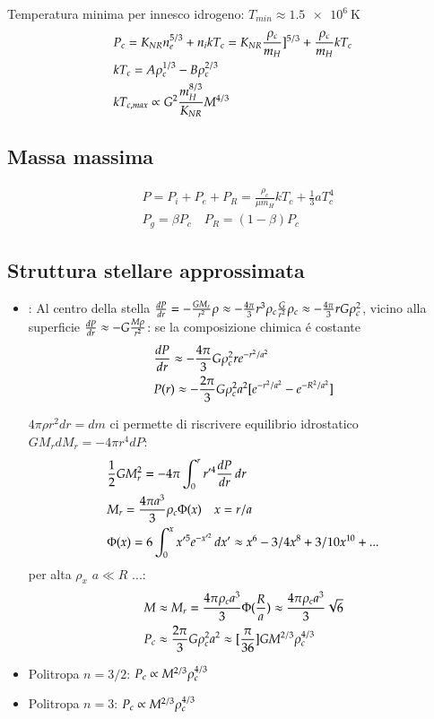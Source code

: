 \documentclass[main.tex]{subfiles}
\begin{document}
Temperatura minima per innesco idrogeno: $T_{min}\approx\SI{1.5e6}{\kelvin}$
\begin{align*}
&P_c=K_{NR}n_e\expy{5/3}+n_ikT_c=K_{NR}\frac{\rho_c}{m_H}]\expy{5/3}+\frac{\rho_c}{m_H}kT_c\\
&kT_c=A\rho_c\expy{1/3}-B\rho_c\expy{2/3}\\
&kT_{c,max}\propto G^2\frac{m_H\expy{8/3}}{K_{NR}}M\expy{4/3}
\end{align*}

\subsection{Massa massima}

\begin{align*}
&P=P_i+P_e+P_R=\frac{\rho_c}{\mu m_H}kT_c+\frac{1}{3}aT_c^4\\
&P_g=\beta P_c\quad P_R=(1-\beta)P_c
\end{align*}

\subsection{Struttura stellare approssimata}

\begin{itemize}
\item {}:
Al centro della stella $\TDy{r}{P}=-\frac{GM_r}{r^2}\rho\approx-\frac{4\pi}{3}r^3\rho_c\frac{G}{r^2}\rho_c\approx-\frac{4\pi}{3}rG\rho_c^2$, vicino alla superficie $\TDy{r}{P}\approx-G\frac{M\rho}{r^2}$: se la composizione chimica \'e costante
\begin{align*}
&\TDy{r}{P}\approx-\frac{4\pi}{3}G\rho_c^2r\exp{-r^2/a^2}\\
&P(r)\approx-\frac{2\pi}{3}G\rho_c^2a^2[\exp{-r^2/a^2}-\exp{-R^2/a^2}]
\end{align*}

$4\pi\rho r^2dr=dm$ ci permette di riscrivere equilibrio idrostatico $GM_rdM_r=-4\pi r^4dP$:
\begin{align*}
&\frac{1}{2}GM_r^2=-4\pi\int_0^rr'^4\TDy{r}{P}\,dr\\
&M_r=\frac{4\pi a^3}{3}\rho_c\Phi(x)\quad x=r/a\\
&\Phi(x)=6\int_0^xx'^5\exp{-x'^2}\,dx'\approx x^6-3/4x^8+3/10x\expy{10}+...
\end{align*}
per alta $\rho_x$ $a\ll R$ ...:
\begin{align*}
&M\approx M_r=\frac{4\pi\rho_ca^3}{3}\Phi(\frac{R}{a})\approx\frac{4\pi\rho_ca^3}{3}\sqrt{6}\\
&P_c\approx\frac{2\pi}{3}G\rho_c^2a^2\approx[\frac{\pi}{36}]GM\expy{2/3}\rho_c\expy{4/3}
\end{align*}

\item Politropa $n=3/2$: $P_c\propto M\expy{2/3}\rho_c\expy{4/3}$

\item Politropa $n=3$: $P_c\propto M\expy{2/3}\rho_c\expy{4/3}$

\end{itemize}
\end{document}
